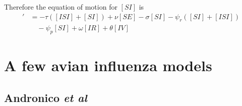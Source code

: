 \documentclass[aspectratio=43]{beamer}
\begin{document}
\begin{frame}
Therefore the equation of motion for $[SI]$ is
\begin{align*}
	[SI]' &= -\tau([ISI]+[SI])+\nu[SE]-\sigma[SI]-\psi_r([SI]+[ISI])\\
	&\quad -\psi_p[SI]+\omega[IR]+\theta[IV]
\end{align*}
\end{frame}



\section{A few avian influenza models}

\subsection{Andronico \emph{et al}}
\end{document}
